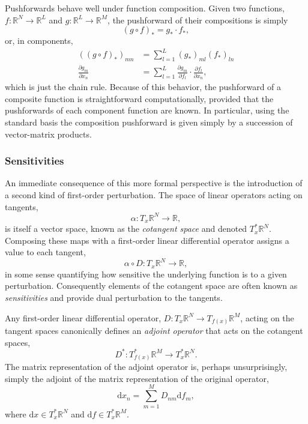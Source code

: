 Pushforwards behave well under function composition.  Given two functions,
$f : \mathbb{R}^{N} \rightarrow \mathbb{R}^{L}$ and
$g : \mathbb{R}^{L} \rightarrow \mathbb{R}^{M}$, the pushforward of their compositions
is simply
%
\begin{equation*}
\left( g \circ f \right)_{*} = g_{*} \cdot f_{*},
\end{equation*}
%
or, in components,
%
\begin{align*}
\left( \left( g \circ f \right)_{*} \right)_{mn} &= 
\sum_{l = 1}^{L} \left( g_{*} \right)_{ml} \left( f_{*} \right)_{ln}
\\
\frac{ \partial g_{m} }{ \partial x_{n} } &= 
\sum_{l = 1}^{L} \frac{ \partial g_{m} }{ \partial f_{l} } \cdot \frac{ \partial f_{l} }{ \partial x_{n} },
\end{align*}
%
which is just the chain rule.  Because of this behavior, the pushforward of a
composite function is straightforward computationally, provided that the pushforwards
of each component function are known.  In particular, using the standard basis the
composition pushforward is given simply by a succession of vector-matrix products.

\subsubsection{Sensitivities}

An immediate consequence of this more formal perspective is the introduction of a second
kind of first-order perturbation.  The space of linear operators acting on tangents,
%
\begin{equation*}
\alpha : T_{x} \mathbb{R}^{N} \rightarrow \mathbb{R},
\end{equation*}
%
is itself a vector space, known as the \textit{cotangent space} and denoted 
$T^{*}_{x} \mathbb{R}^{N}$.  Composing these maps with a first-order linear differential 
operator assigns a value to each tangent,
%
\begin{equation*}
\alpha \circ D : T_{x} \mathbb{R}^{N} \rightarrow \mathbb{R},
\end{equation*}
%
in some sense quantifying how sensitive the underlying function is to a given 
perturbation.  Consequently elements of the cotangent space are often known as
\textit{sensitivities} and provide dual perturbation to the tangents.

Any first-order linear differential operator,
$D : T_{x} \mathbb{R}^{N} \rightarrow T_{ f ( x ) } \mathbb{R}^{M}$, acting on
the tangent spaces canonically defines an \textit{adjoint operator} that acts on the 
cotangent spaces,
%
\begin{equation*}
D^{*} : T^{*}_{f (x) } \mathbb{R}^{M} \rightarrow T^{*}_{x} \mathbb{R}^{N}.
\end{equation*}
%
The matrix representation of the adjoint operator is, perhaps unsurprisingly, 
simply the adjoint of the matrix representation of the original operator,
%
\begin{equation*}
\mathrm{d} x_{n} = \sum_{m = 1}^{M} D_{nm} \mathrm{d} f_{m},
\end{equation*}
%
where $\mathrm{d} x \in T^{*}_{x} \mathbb{R}^{N}$ and
$\mathrm{d} f \in T^{*}_{x} \mathbb{R}^{M}$.

